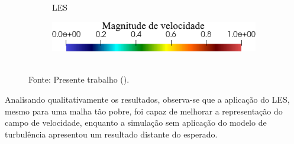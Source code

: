 \begin{figure}[h!]
\begin{subfigure}{0.32\textwidth}
        \caption{LES}
    \end{subfigure}
    \begin{subfigure}{0.4\textwidth}
        \centering
        \includegraphics[width=\linewidth]{Figuras/Cavity/legenda.png}
    \end{subfigure}
    \\Fonte: Presente trabalho (\the\year).
    \label{fig:cavity-results5}
\end{figure}

Analisando qualitativamente os resultados, observa-se que a aplicação do LES, mesmo para uma malha tão pobre, foi capaz de melhorar a representação do campo de velocidade, enquanto a simulação sem aplicação do modelo de turbulência apresentou um resultado distante do esperado.

